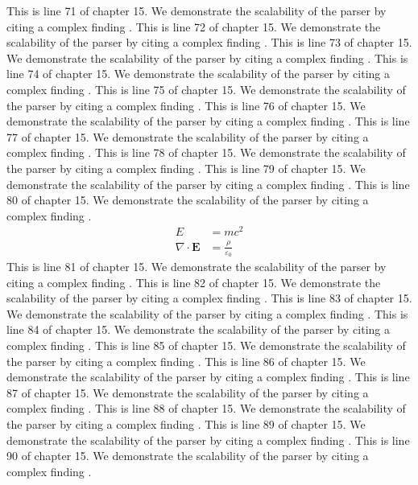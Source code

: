 This is line 71 of chapter 15. We demonstrate the scalability of the parser by citing a complex finding \cite{ref15_71}.
This is line 72 of chapter 15. We demonstrate the scalability of the parser by citing a complex finding \cite{ref15_72}.
This is line 73 of chapter 15. We demonstrate the scalability of the parser by citing a complex finding \cite{ref15_73}.
This is line 74 of chapter 15. We demonstrate the scalability of the parser by citing a complex finding \cite{ref15_74}.
This is line 75 of chapter 15. We demonstrate the scalability of the parser by citing a complex finding \cite{ref15_75}.
This is line 76 of chapter 15. We demonstrate the scalability of the parser by citing a complex finding \cite{ref15_76}.
This is line 77 of chapter 15. We demonstrate the scalability of the parser by citing a complex finding \cite{ref15_77}.
This is line 78 of chapter 15. We demonstrate the scalability of the parser by citing a complex finding \cite{ref15_78}.
This is line 79 of chapter 15. We demonstrate the scalability of the parser by citing a complex finding \cite{ref15_79}.
This is line 80 of chapter 15. We demonstrate the scalability of the parser by citing a complex finding \cite{ref15_80}.
\begin{align*}
  E &= mc^2 \\
  \nabla \cdot \mathbf{E} &= \frac{\rho}{\varepsilon_0}
\end{align*}
This is line 81 of chapter 15. We demonstrate the scalability of the parser by citing a complex finding \cite{ref15_81}.
This is line 82 of chapter 15. We demonstrate the scalability of the parser by citing a complex finding \cite{ref15_82}.
This is line 83 of chapter 15. We demonstrate the scalability of the parser by citing a complex finding \cite{ref15_83}.
This is line 84 of chapter 15. We demonstrate the scalability of the parser by citing a complex finding \cite{ref15_84}.
This is line 85 of chapter 15. We demonstrate the scalability of the parser by citing a complex finding \cite{ref15_85}.
This is line 86 of chapter 15. We demonstrate the scalability of the parser by citing a complex finding \cite{ref15_86}.
This is line 87 of chapter 15. We demonstrate the scalability of the parser by citing a complex finding \cite{ref15_87}.
This is line 88 of chapter 15. We demonstrate the scalability of the parser by citing a complex finding \cite{ref15_88}.
This is line 89 of chapter 15. We demonstrate the scalability of the parser by citing a complex finding \cite{ref15_89}.
This is line 90 of chapter 15. We demonstrate the scalability of the parser by citing a complex finding \cite{ref15_90}.

